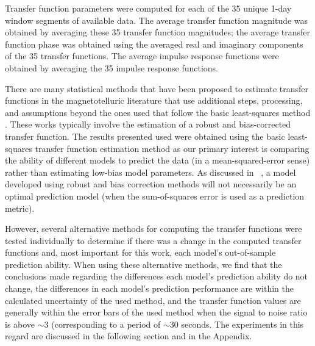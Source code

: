 \documentclass[draft,linenumbers]{agujournal2018}
\begin{document}


Transfer function parameters were computed for each of the 35 unique 1-day window segments of available data. The average transfer function magnitude was obtained by averaging these 35 transfer function magnitudes; the average transfer function phase was obtained using the averaged real and imaginary components of the 35 transfer functions. The average impulse response functions were obtained by averaging the 35 impulse response functions. 

There are many statistical methods that have been proposed to estimate transfer functions in the magnetotelluric literature that use additional steps, processing, and assumptions \citep{Egbert1986,Chave1987,Chave1989,Jones1989,Larsen1996,Egbert1997,Eisel2001,Chave2004,Chave2012,Chave2017} beyond the ones used that follow the basic least-squares method \citep{Simpson2005}. These works typically involve the estimation of a robust and bias-corrected transfer function. The results presented used were obtained using the basic least-squares transfer function estimation method as our primary interest is comparing the ability of different models to predict the data (in a mean-squared-error sense) rather than estimating low-bias model parameters. As discussed in ~\cite{Weigel2017}, a model developed using robust and bias correction methods will not necessarily be an optimal prediction model (when the sum-of-squares error is used as a prediction metric).

However, several alternative methods for computing the transfer functions were tested individually to determine if there was a change in the computed transfer functions and, most important for this work, each model's out-of-sample prediction ability. When using these alternative methods, we find that the conclusions made regarding the differences each model's prediction ability do not change, the differences in each model's prediction performance are within the calculated uncertainty of the used method, and the transfer function values are generally within the error bars of the used method when the signal to noise ratio is above $\sim$3 (corresponding to a period of $\sim 30$ seconds. The experiments in this regard are discussed in the following section and in the Appendix.
\end{document}
